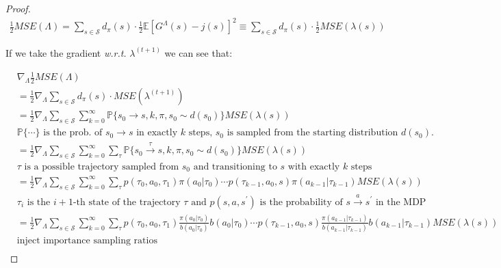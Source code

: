 \documentclass{article}
\newcommand\wrt{\textit{w.r.t.}}
\newcommand\doubleE{\mathbb{E}}
\newcommand\doubleP{\mathbb{P}}
\newcommand\scriptS{\mathcal{S}}
\begin{document}
\begin{proof}
\begin{equation}
\begin{aligned}
\frac{1}{2} MSE(\Lambda) = \sum_{s \in \scriptS}{d_\pi(s) \cdot \frac{1}{2} \doubleE[G^\Lambda(s) - j(s)]^2} \equiv \sum_{s \in \scriptS}{d_\pi(s) \cdot \frac{1}{2} MSE(\lambda(s))}
\end{aligned}\nonumber
\end{equation}

If we take the gradient \wrt{} $\lambda^{(t+1)}$ we can see that:

\begin{equation}
\begin{aligned}
& \nabla_{\Lambda}
\frac{1}{2} MSE(\Lambda)\\
& = \frac{1}{2} \nabla_{\Lambda} \sum_{s \in \scriptS}{d_\pi(s) \cdot MSE(\lambda^{(t+1)})}\\
& =  \frac{1}{2} \nabla_{\Lambda} \sum_{s \in \scriptS}{\sum_{k=0}^{\infty}{\doubleP\{s_0 \to s, k, \pi, s_0 \sim d(s_0) \} MSE(\lambda(s))}}\\
& \text{$\doubleP\{\cdots\}$ is the prob. of $s_0 \to s$ in exactly $k$ steps, $s_0$ is sampled from the starting distribution $d(s_0)$.}\\
& = \frac{1}{2} \nabla_{\Lambda} \sum_{s \in \scriptS}{\sum_{k=0}^{\infty}{\sum_{\tau}{\doubleP\{s_0 \xrightarrow{\tau} s, k, \pi, s_0 \sim d(s_0) \} MSE(\lambda(s))}}}\\
& \text{$\tau$ is a possible trajectory sampled from $s_0$ and transitioning to $s$ with exactly $k$ steps}\\
& = \frac{1}{2} \nabla_{\Lambda} \sum_{s \in \scriptS}{\sum_{k=0}^{\infty}{\sum_{\tau}{p(\tau_0, a_0, \tau_1)\pi(a_0|\tau_0) \cdots p(\tau_{k-1}, a_0, s)\pi(a_{k-1}|\tau_{k-1}) MSE(\lambda(s))}}}\\
& \text{$\tau_i$ is the $i+1$-th state of the trajectory $\tau$ and $p(s, a, s^{'})$ is the probability of $s \xrightarrow{a} s^{'}$ in the MDP}\\
& = \frac{1}{2} \nabla_{\Lambda} \sum_{s \in \scriptS}{\sum_{k=0}^{\infty}{\sum_{\tau}{p(\tau_0, a_0, \tau_1)
\frac{\pi(a_0|\tau_0)}{b(a_0|\tau_0)}
b(a_0|\tau_0)
\cdots p(\tau_{k-1}, a_0, s)
\frac{\pi(a_{k-1}|\tau_{k-1})}{b(a_{k-1}|\tau_{k-1})}
b(a_{k-1}|\tau_{k-1}) MSE(\lambda(s))}}}\\
& \text{inject importance sampling ratios}\\
\end{aligned}\nonumber
\end{equation}

\end{proof}
\end{document}
